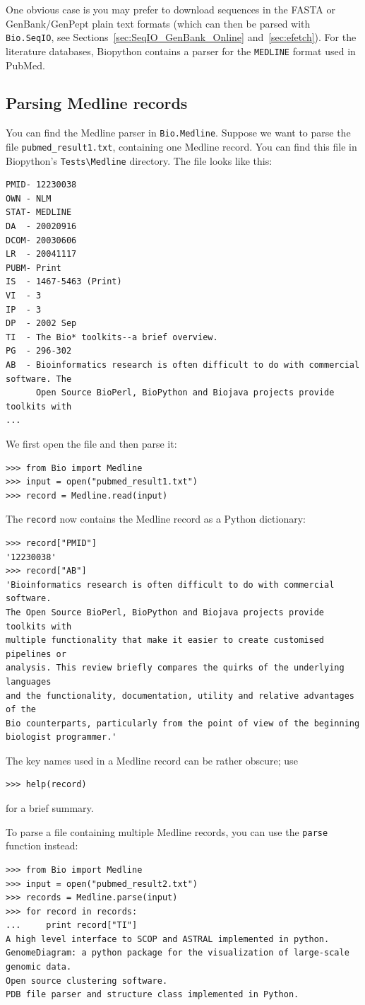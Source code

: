 \documentclass{report}
\begin{document}
One obvious case is you may prefer to download sequences in the FASTA or GenBank/GenPept plain text formats (which can then be parsed with \verb|Bio.SeqIO|, see Sections~\ref{sec:SeqIO_GenBank_Online} and~\ref{sec:efetch}).  For the literature databases, Biopython contains a parser for the \verb+MEDLINE+ format used in PubMed.

\subsection{Parsing Medline records}
\label{subsec:entrez-and-medline}
You can find the Medline parser in \verb+Bio.Medline+. Suppose we want to parse the file \verb+pubmed_result1.txt+, containing one Medline record. You can find this file in Biopython's \verb+Tests\Medline+ directory. The file looks like this:

\begin{verbatim}
PMID- 12230038
OWN - NLM
STAT- MEDLINE
DA  - 20020916
DCOM- 20030606
LR  - 20041117
PUBM- Print
IS  - 1467-5463 (Print)
VI  - 3
IP  - 3
DP  - 2002 Sep
TI  - The Bio* toolkits--a brief overview.
PG  - 296-302
AB  - Bioinformatics research is often difficult to do with commercial software. The
      Open Source BioPerl, BioPython and Biojava projects provide toolkits with
...
\end{verbatim}
We first open the file and then parse it:
\begin{verbatim}
>>> from Bio import Medline
>>> input = open("pubmed_result1.txt")
>>> record = Medline.read(input)
\end{verbatim}
The \verb+record+ now contains the Medline record as a Python dictionary:
\begin{verbatim}
>>> record["PMID"]
'12230038'
>>> record["AB"]
'Bioinformatics research is often difficult to do with commercial software.
The Open Source BioPerl, BioPython and Biojava projects provide toolkits with
multiple functionality that make it easier to create customised pipelines or
analysis. This review briefly compares the quirks of the underlying languages
and the functionality, documentation, utility and relative advantages of the
Bio counterparts, particularly from the point of view of the beginning
biologist programmer.'
\end{verbatim}
The key names used in a Medline record can be rather obscure; use
\begin{verbatim}
>>> help(record)
\end{verbatim}
for a brief summary.

To parse a file containing multiple Medline records, you can use the \verb+parse+ function instead:
\begin{verbatim}
>>> from Bio import Medline
>>> input = open("pubmed_result2.txt")
>>> records = Medline.parse(input)
>>> for record in records:
...     print record["TI"]
A high level interface to SCOP and ASTRAL implemented in python.
GenomeDiagram: a python package for the visualization of large-scale genomic data.
Open source clustering software.
PDB file parser and structure class implemented in Python.
\end{verbatim}
\end{document}
